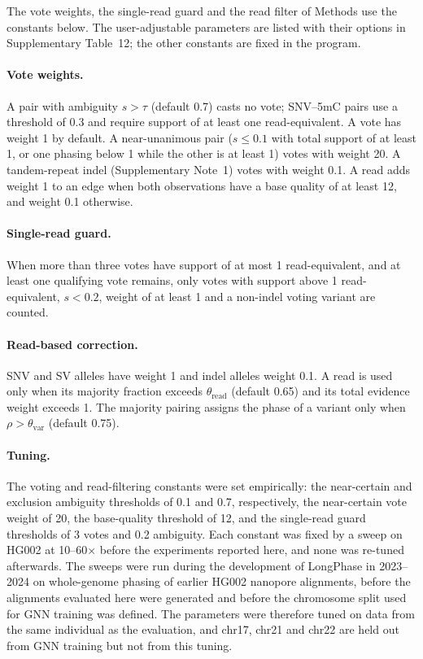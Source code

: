 \documentclass[11pt,a4paper]{article}
\newcommand{\longphase}{LongPhase\xspace}
\begin{document}
The vote weights, the single-read guard and the read filter of Methods use the constants below. The user-adjustable parameters are listed with their options in Supplementary Table~12; the other constants are fixed in the program.

\paragraph{Vote weights.} A pair with ambiguity $s>\tau$ (default 0.7) casts no vote; SNV--5mC pairs use a threshold of 0.3 and require support of at least one read-equivalent. A vote has weight 1 by default. A near-unanimous pair ($s\le0.1$ with total support of at least 1, or one phasing below 1 while the other is at least 1) votes with weight 20. A tandem-repeat indel (Supplementary Note~1) votes with weight 0.1. A read adds weight 1 to an edge when both observations have a base quality of at least 12, and weight 0.1 otherwise.

\paragraph{Single-read guard.} When more than three votes have support of at most 1 read-equivalent, and at least one qualifying vote remains, only votes with support above 1 read-equivalent, $s<0.2$, weight of at least 1 and a non-indel voting variant are counted.

\paragraph{Read-based correction.} SNV and SV alleles have weight 1 and indel alleles weight 0.1. A read is used only when its majority fraction exceeds $\theta_{\mathrm{read}}$ (default 0.65) and its total evidence weight exceeds 1. The majority pairing assigns the phase of a variant only when $\rho>\theta_{\mathrm{var}}$ (default 0.75).

\paragraph{Tuning.} The voting and read-filtering constants were set empirically: the near-certain and exclusion ambiguity thresholds of 0.1 and 0.7, respectively, the near-certain vote weight of 20, the base-quality threshold of 12, and the single-read guard thresholds of 3 votes and 0.2 ambiguity. Each constant was fixed by a sweep on HG002 at 10--60$\times$ before the experiments reported here, and none was re-tuned afterwards. The sweeps were run during the development of \longphase in 2023--2024 on whole-genome phasing of earlier HG002 nanopore alignments, before the alignments evaluated here were generated and before the chromosome split used for GNN training was defined. The parameters were therefore tuned on data from the same individual as the evaluation, and chr17, chr21 and chr22 are held out from GNN training but not from this tuning.
\end{document}
